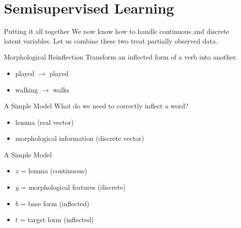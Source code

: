 \documentclass[14pt]{beamer}
\begin{document}
\begin{frame}[allowframebreaks]


\end{frame}

\section{Semisupervised Learning}

\begin{frame}{Putting it all together}
We now know how to handle continuous and discrete latent variables. Let us combine these two treat partially observed data.
\pause
\begin{block}{Morphological Reinflection}
Transform an inflected form of a verb into another.
\begin{itemize}
\pause
\item played $ \rightarrow $ played
\pause
\item walking $ \rightarrow $ walks
\end{itemize}
\end{block}
\end{frame}

\begin{frame}{A Simple Model \citep{ZhouNeubig:2017}}
What do we need to correctly inflect a word?
\pause
\begin{itemize}
\item lemma \pause (real vector)
\pause
\item morphological information \pause (discrete vector)
\end{itemize}
\end{frame}

\begin{frame}{A Simple Model \citep{ZhouNeubig:2017}}
\begin{figure}
\center
{}
\end{figure}
\begin{itemize}
\item $ z $ = lemma (continuous)
\item $ y $ = morphological features (discrete)
\item $ b $ = base form (inflected)
\item $ t $ = target form (inflected)
\end{itemize}
\end{frame}
\end{document}
